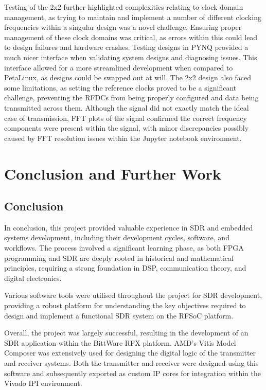 \documentclass[12pt, a4paper]{article}
\begin{document}
Testing of the 2x2 further highlighted complexities relating to clock domain management, as trying to maintain and implement a number of different clocking frequencies within a singular design was a novel challenge. Ensuring proper management of these clock domains was critical, as errors within this could lead to design failures and hardware crashes. Testing designs in PYNQ provided a much nicer interface when validating system designs and diagnosing issues. This interface allowed for a more streamlined development when compared to PetaLinux, as designs could be swapped out at will. The 2x2 design also faced some limitations, as setting the reference clocks proved to be a significant challenge, preventing the RFDCs from being properly configured and data being transmitted across them. Although the signal did not exactly match the ideal case of transmission, FFT plots of the signal confirmed the correct frequency components were present within the signal, with minor discrepancies possibly caused by FFT resolution issues within the Jupyter notebook environment.

\newpage
\section{Conclusion and Further Work}
\subsection{Conclusion}

In conclusion, this project provided valuable experience in SDR and embedded systems development, including their development cycles, software, and workflows. The process involved a significant learning phase, as both FPGA programming and SDR are deeply rooted in historical and mathematical principles, requiring a strong foundation in DSP, communication theory, and digital electronics.

Various software tools were utilised throughout the project for SDR development, providing a robust platform for understanding the key objectives required to design and implement a functional SDR system on the RFSoC platform.

Overall, the project was largely successful, resulting in the development of an SDR application within the BittWare RFX platform. AMD’s Vitis Model Composer was extensively used for designing the digital logic of the transmitter and receiver systems. Both the transmitter and receiver were designed using this software and subsequently exported as custom IP cores for integration within the Vivado IPI environment.
\end{document}
